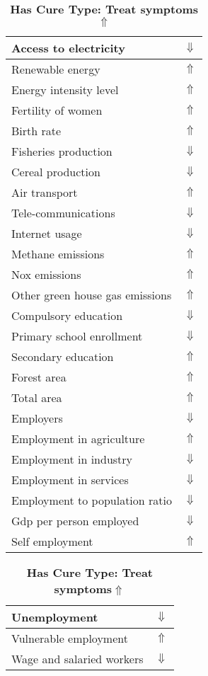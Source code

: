 \documentclass[12pt,notitlepage,oneside]{report}
\begin{document}
\begin{table}[!htb]
\caption{\textbf{Has Cure Type: Treat symptoms$ \Uparrow$}}
\centering
\label{Correlated Socio-economic Factors0}
\begin{tabular}{|l|l|}
\hline
Access to electricity & $\Downarrow$\\ \hline
Renewable energy & $\Uparrow$\\ \hline
Energy intensity level & $\Uparrow$\\ \hline
Fertility of women & $\Uparrow$\\ \hline
Birth rate & $\Uparrow$\\ \hline
Fisheries production & $\Downarrow$\\ \hline
Cereal production & $\Downarrow$\\ \hline
Air transport  & $\Uparrow$\\ \hline
Tele-communications & $\Downarrow$\\ \hline
Internet usage & $\Downarrow$\\ \hline
Methane emissions & $\Uparrow$\\ \hline
Nox emissions & $\Uparrow$\\ \hline
Other green house gas emissions & $\Uparrow$\\ \hline
Compulsory education & $\Downarrow$\\ \hline
Primary school enrollment & $\Downarrow$\\ \hline
Secondary education & $\Uparrow$\\ \hline
Forest area & $\Uparrow$\\ \hline
Total area & $\Uparrow$\\ \hline
Employers & $\Downarrow$\\ \hline
Employment in agriculture & $\Uparrow$\\ \hline
Employment in industry & $\Downarrow$\\ \hline
Employment in services & $\Downarrow$\\ \hline
Employment to population ratio & $\Downarrow$\\ \hline
Gdp per person employed & $\Downarrow$\\ \hline
Self employment & $\Uparrow$\\ \hline
\end{tabular}
\begin{tabular}{|l|l|}
\hline
Unemployment & $\Downarrow$\\ \hline
Vulnerable employment & $\Uparrow$\\ \hline
Wage and salaried workers & $\Downarrow$\\ \hline

\end{tabular}
\end{table}
\end{document}

